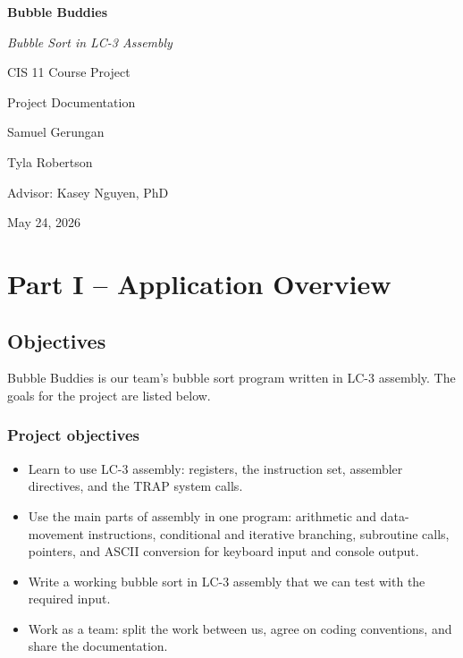 \documentclass[11pt]{article}
\begin{document}
\begin{titlepage}
\centering
\vspace*{\fill}

{\Huge\bfseries Bubble Buddies\par}
\vspace{0.35cm}
{\Large\itshape Bubble Sort in LC-3 Assembly\par}

\vspace{1.2cm}

{\Large CIS 11 \textemdash{} Course Project\par}
\vspace{0.2cm}
{\large Project Documentation\par}

\vspace{1.2cm}

{\large Samuel Gerungan\par}
\vspace{0.1cm}
{\large Tyla Robertson\par}

\vspace{1.2cm}

{\normalsize Advisor: Kasey Nguyen, PhD\par}
\vspace{0.25cm}
{\normalsize May 24, 2026\par}

\vspace*{\fill}
\end{titlepage}

\section*{Part I -- Application Overview}

\subsection*{Objectives}

Bubble Buddies is our team's bubble sort program written in LC-3 assembly. The goals for the project are listed below.


\subsubsection*{Project objectives}

\begin{itemize}
  \item Learn to use LC-3 assembly: registers, the instruction set, assembler directives, and the TRAP system calls.
  \item Use the main parts of assembly in one program: arithmetic and data-movement instructions, conditional and iterative branching, subroutine calls, pointers, and ASCII conversion for keyboard input and console output.
  \item Write a working bubble sort in LC-3 assembly that we can test with the required input.
  \item Work as a team: split the work between us, agree on coding conventions, and share the documentation.
\end{itemize}
\end{document}

